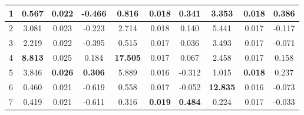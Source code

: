 \begin{singlespacing}
\begin{center}
\begin{threeparttable}
\begin{small}
\begin{tabular}{|l|c|c|c|c|c|c|c|c|c|}
        \hline
        1 & 0.567   & 0.022 & -0.466    & 0.816     & 0.018 & 0.341   & 3.353     & \textbf{0.018} & \textbf{0.386}   \\
        \hline
        2 & 3.081 & 0.023   & -0.223    & 2.714     & 0.018 & 0.140   & 5.441     & 0.017 & -0.117  \\
        \hline
        3 & 2.219 & 0.022   & -0.395    & 0.515     & 0.017 & 0.036   & 3.493     & 0.017 & -0.071  \\
        \hline
        4 & \textbf{8.813} & 0.025   & 0.184     & \textbf{17.505}    & 0.017 & 0.067   & 2.458     & 0.017 & 0.158   \\
        \hline
        5 & 3.846 & \textbf{0.026} & \textbf{0.306}     & 5.889     & 0.016 & -0.312    & 1.015     & \textbf{0.018} & 0.237   \\
        \hline
        6 & 0.460 & 0.021 & -0.619    & 0.558     & 0.017 & -0.052    & \textbf{12.835}    & 0.016 & -0.073  \\
        \hline
        7 & 0.419 & 0.021 & -0.611    & 0.316     & \textbf{0.019} & \textbf{0.484}     & 0.224     & 0.017 & -0.033  \\
        \hline
        \end{tabular}
    \end{small}
    \end{threeparttable}
\end{center}
\end{singlespacing}